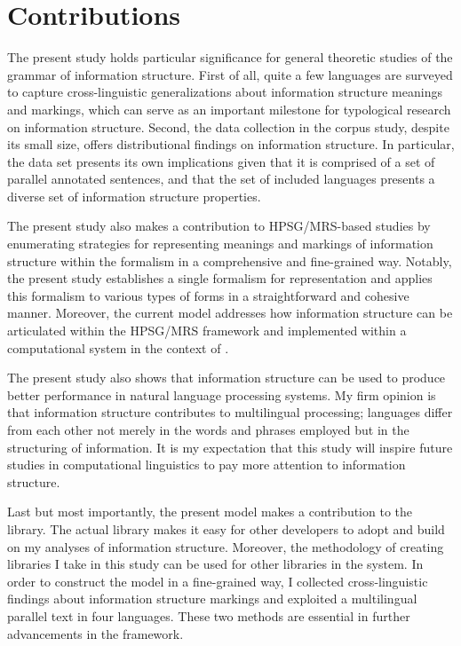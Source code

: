 \section{Contributions}
\label{15:sec:contributions}

The present study holds particular significance for general theoretic
studies of the grammar of information structure. First of all, quite a
few languages are surveyed to capture cross-linguistic generalizations
about information structure meanings and markings, which can serve as
an important milestone for typological research on information
structure. Second, the data collection in the corpus study, despite
its small size, offers distributional findings on information
structure. In particular, the data set presents its own implications
given that it is comprised of a set of parallel annotated sentences,
and that the set of included languages presents a diverse set of
information structure properties.



The present study also makes a contribution to HPSG/MRS-based
studies by enumerating strategies for representing
meanings and markings of information structure within the formalism in
a comprehensive and fine-grained way.  Notably, the present study
establishes a single formalism for representation and applies this
formalism to various types of forms in a straightforward and cohesive
manner. Moreover, the current model addresses how information
structure can be articulated within the HPSG/MRS framework and
implemented within a computational system in the context of
.



The present study also shows that information structure can be used to
produce better performance in natural language processing systems. My
firm opinion is that information structure contributes to multilingual
processing; languages differ from each other not merely in the words
and phrases employed but in the structuring of information. It is my
expectation that this study will inspire future studies in
computational linguistics to pay more attention to information
structure.


Last but most importantly, the present model makes a contribution to
the \lingo {} library. The actual library makes it easy
for other developers to adopt and build on my analyses of information
structure.  Moreover, the methodology of creating libraries I take in
this study can be used for other libraries in the system.  In order to
construct the model in a fine-grained way, I collected
cross-linguistic findings about information structure markings and
exploited a multilingual parallel text in four languages. These two
methods are essential in further advancements in the \lingo framework.





